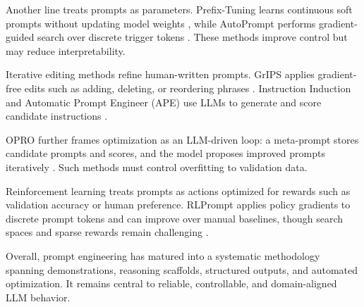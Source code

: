 Another line treats prompts as parameters. Prefix-Tuning learns continuous soft prompts without updating model weights \cite{li2021prefix}, while AutoPrompt performs gradient-guided search over discrete trigger tokens \cite{shin2020autoprompt}. These methods improve control but may reduce interpretability.

Iterative editing methods refine human-written prompts. GrIPS applies gradient-free edits such as adding, deleting, or reordering phrases \cite{prasad2023grips}. Instruction Induction and Automatic Prompt Engineer (APE) use LLMs to generate and score candidate instructions \cite{zhou2022ape}.

OPRO further frames optimization as an LLM-driven loop: a meta-prompt stores candidate prompts and scores, and the model proposes improved prompts iteratively \cite{yao2023opro}. Such methods must control overfitting to validation data.

Reinforcement learning treats prompts as actions optimized for rewards such as validation accuracy or human preference. RLPrompt applies policy gradients to discrete prompt tokens and can improve over manual baselines, though search spaces and sparse rewards remain challenging \cite{deng2022rlprompt}.

Overall, prompt engineering has matured into a systematic methodology spanning demonstrations, reasoning scaffolds, structured outputs, and automated optimization. It remains central to reliable, controllable, and domain-aligned LLM behavior.

\newpage
